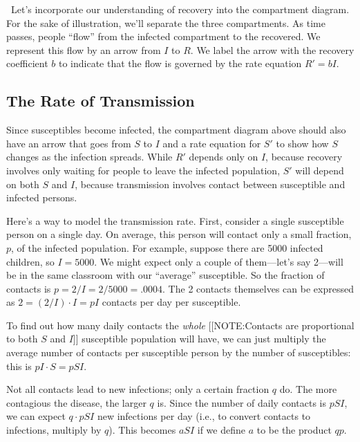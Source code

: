 \setlength{\unitlength}{1pt}

\quad\ Let's incorporate our understanding of recovery into the
compartment diagram.  For the sake of illustration, we'll separate the
three compartments.  As time passes, people ``flow'' from the infected
compartment to the recovered.  We represent this flow by an arrow from
$I$ to $R$.  We label the arrow with the recovery coefficient $b$ to
indicate that the flow is governed by the rate equation $R' = b I$.


\subsection{The Rate of Transmission}
\label{subsec:the-rate-of-transmission}

Since susceptibles become infected, the compartment diagram above
should also have an arrow that goes from $S$ to $I$ and a rate
equation for $S'$ to show how $S$ changes as the infection spreads.
While $R'$ depends only on $I$, because recovery involves only waiting
for people to leave the infected population, $S'$ will depend on both
$S$ and $I$, because transmission involves contact between susceptible
and infected persons.

Here's a way to model the transmission rate.  First, consider a single
susceptible person on a single day.  On average, this person will
contact only a small fraction, $p$, of the infected population.  For
example, suppose there are 5000 infected children, so $I = 5000$.  We
might expect only a couple of them---let's say 2---will be in the same
classroom with our ``average'' susceptible.  So the fraction of
contacts is $p = 2/I = 2/5000 = .0004$.  The 2 contacts themselves can
be expressed as $2 = (2/I)\cdot I = pI$ contacts per day per
susceptible.

To find out how many daily contacts the {\em whole\/} 
[[NOTE:Contacts are proportional to both $S$ and $I$]]
susceptible population will have, we can just multiply the average
number of contacts per susceptible person by the number of
susceptibles: this is $pI \cdot S = pSI$.

Not all contacts lead to new infections; only a certain fraction $q$
do.  The more contagious the disease, the larger $q$ is.  Since the
number of daily contacts is $pSI$, we can expect $q \cdot pSI$ new
infections per day (i.e., to convert contacts to infections, multiply
by $q$).  This becomes $aSI$ if we define $a$ to be the product $qp$.


